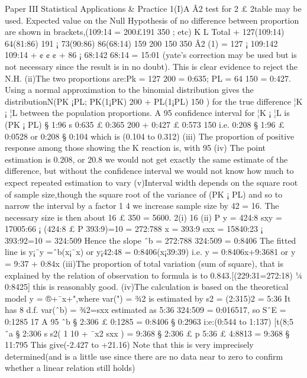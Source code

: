 Paper III
Statistical Applications & Practice
1(I)A Â2 test for 2 £ 2table may be used. Expected value on the Null Hypothesis of
no difference between proportion are shown in brackets,(109:14 = 200£191
350 ; etc)
K L Total
+ 127(109:14) 64(81:86) 191
¡ 73(90:86) 86(68:14) 159
200 150 350
Â2
(1) =
127 ¡ 109:142
109:14
+ ¢ ¢ ¢ +
86 ¡ 68:142
68:14
= 15:01
(yate’s correction may be used but is not necessary since the result is in no doubt). This
is clear evidence to reject the N.H.
(ii)The two proportions are:Pk = 127
200 = 0:635; PL = 64
150 = 0:427. Using a normal
approximation to the binomial distribution gives the distributionN(PK ¡PL; PK(1¡PK)
200 +
PL(1¡PL)
150 ) for the true difference ¦K ¡ ¦L between the population proportions. A 95%
confidence interval for ¦K ¡ ¦L is
(PK ¡ PL) § 1:96
s
0:635 £ 0:365
200
+
0:427 £ 0:573
150
i.e. 0:208 § 1:96 £ 0:0528 or 0:208 § 0:104 which is (0.104 to 0.312)
(iii) The proportion of positive response among those showing the K reaction is, with
95%
(iv) The point estimation is 0.208, or 20.8%
we would not get exactly the same estimate of the difference, but without the confidence
interval we would not know how much to expect repeated estimation to vary
(v)Interval width depends on the square root of sample size,though the square root
of the variance of (PK ¡ PL) and so to narrow the interval by a factor 1
4 we increase
sample size by 42 = 16. The necessary size is then about 16 £ 350 = 5600.
2(i)
16
(ii) P
y = 424:8 sxy = 17005:66 ¡ (424:8 £ P 393:9)=10 = 272:788
x = 393:9 sxx = 15840:23 ¡ 393:92=10 = 324:509
Hence the slope
ˆb
=
272:788
324:509
= 0:8406
The fitted line is y¡¯y =ˆb(x¡¯x) or y¡42:48 = 0:8406(x¡39:39) i.e. y = 0:8406x+9:3681
or y = 9:37 + 0:84x
(iii)The proportion of total variation (sum of square), that is explained by the relation
of observation to formula is to 0.843.[(229:31=272:18) ¼ 0:8425] this is reasonably
good.
(iv)The calculation is based on the theoretical model y = ®+¯x+",where var(") =
¾2 is estimated by s2 = (2:315)2 = 5:36 It has 8 d.f. var(ˆb) = ¾2=sxx estimated as
5:36
324:509 = 0:016517, so SˆE = 0:1285
17
A 95%
ˆb
§ 2:306 £ 0:1285 = 0:8406 § 0:2963 i:e:(0:544 to 1:137)
[t(8;5%
ˆa § 2:306
s
s2(
1
10
+
¯x2
sxx
) = 9:368 § 2:306 £
p
5:36 £ 4:8813 = 9:368 § 11:795
This give(-2.427 to +21.16)
Note that this is very imprecisely determined(and is a little use since there are no data
near to zero to confirm whether a linear relation still holds)
